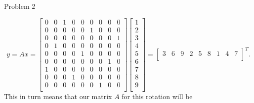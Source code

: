 \begin{problem}{Problem 2}
\begin{highlight}
        \begin{equation}
            y = Ax = 
            \begin{bmatrix}
                0 & 0 & 1 & 0 & 0 & 0 & 0 & 0 & 0 \\
                0 & 0 & 0 & 0 & 0 & 1 & 0 & 0 & 0 \\
                0 & 0 & 0 & 0 & 0 & 0 & 0 & 0 & 1 \\
                0 & 1 & 0 & 0 & 0 & 0 & 0 & 0 & 0 \\
                0 & 0 & 0 & 0 & 1 & 0 & 0 & 0 & 0 \\
                0 & 0 & 0 & 0 & 0 & 0 & 0 & 1 & 0 \\
                1 & 0 & 0 & 0 & 0 & 0 & 0 & 0 & 0 \\
                0 & 0 & 0 & 1 & 0 & 0 & 0 & 0 & 0 \\
                0 & 0 & 0 & 0 & 0 & 0 & 1 & 0 & 0 \\
            \end{bmatrix}
            \begin{bmatrix}
                1 \\
                2 \\
                3 \\
                4 \\
                5 \\
                6 \\
                7 \\
                8 \\
                9 \\
            \end{bmatrix}
            = 
            \begin{bmatrix}
                3 & 6 & 9 & 2 & 5 & 8 & 1 & 4 & 7 \\
            \end{bmatrix}^{T}.
        \end{equation}
        This in turn means that our matrix $A$ for this rotation will be
        

\end{highlight}
\end{problem}
